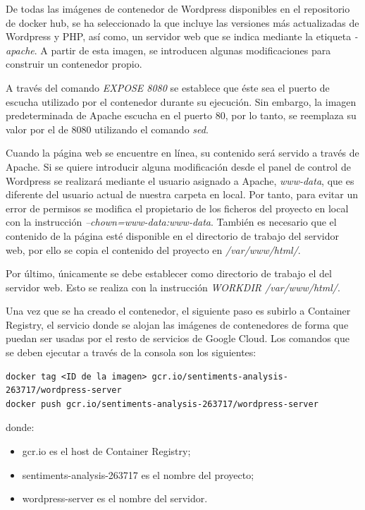 De todas las imágenes de contenedor de Wordpress disponibles en el repositorio de docker hub, se ha seleccionado la que incluye las versiones más actualizadas de Wordpress y PHP, así como,  un servidor web que se indica mediante la etiqueta \textit{-apache}. A partir de esta imagen, se introducen algunas modificaciones para construir un contenedor propio. 

A través del comando \textit{EXPOSE 8080} se establece que éste sea el puerto de escucha utilizado por el contenedor durante su ejecución. Sin embargo, la imagen predeterminada de Apache escucha en el puerto 80, por lo tanto, se reemplaza su valor por el de 8080 utilizando el comando \textit{sed}.

Cuando la página web se encuentre en línea, su contenido será servido a través de Apache. Si se quiere introducir alguna modificación desde el panel de control de Wordpress se realizará mediante el usuario asignado a Apache, \textit{www-data}, que es diferente del usuario actual de nuestra carpeta en local. Por tanto, para evitar un error de permisos se modifica el propietario de los ficheros del proyecto en local con la instrucción \textit{--chown=www-data:www-data}. También es necesario que el contenido de la página esté disponible en el directorio de trabajo del servidor web, por ello se copia el contenido del proyecto en \textit{/var/www/html/}.

Por último, únicamente se debe establecer como directorio de trabajo el del servidor web. Esto se realiza con la instrucción \textit{WORKDIR /var/www/html/}.

Una vez que se ha creado el contenedor, el siguiente paso es subirlo a Container Registry, el servicio donde se alojan las imágenes de contenedores de forma que puedan ser usadas por el resto de servicios de Google Cloud. Los comandos que se deben ejecutar a través de la consola son los siguientes:

\begin{lstlisting}[caption= Subir imagen del contenedor a Container Registry]
docker tag <ID de la imagen> gcr.io/sentiments-analysis-263717/wordpress-server
docker push gcr.io/sentiments-analysis-263717/wordpress-server
\end{lstlisting}

donde:
\begin{itemize}
    \item gcr.io es el host de Container Registry;
    \item sentiments-analysis-263717 es el nombre del proyecto;
    \item wordpress-server es el nombre del servidor.
\end{itemize}

